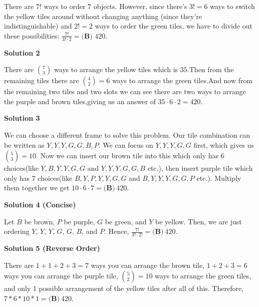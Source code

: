 \begin{enumerate}
 There are $7!$ ways to order $7$ objects. However, since there's $3!=6$ ways to switch the yellow tiles around without changing anything (since they're indistinguishable) and $2!=2$ ways to order the green tiles, we have to divide out these possibilities: $\frac{7!}{3! \cdot2}=\boxed{\textbf{(B) }420}$. 

 



\textbf{Solution 2}

There are $\binom{7}{3}$ ways to arrange the yellow tiles which is $35$.Then from the remaining tiles there are $\binom{4}{2}=6$ ways to arrange the green tiles.And now from the remaining two tiles and two slots we can see there are two ways to arrange the purple and brown tiles,giving us an answer of $35\cdot6\cdot2=420$.

 



\textbf{Solution 3}

We can choose a different frame to solve this problem. Our tile combination can be written as $Y, Y, Y, G, G, B, P.$ We can focus on $Y, Y, Y, G, G$ first, which gives us $\binom{5}{3}=10.$ Now we can insert our brown tile into this which only has $6$ choices(like $Y,B, Y, Y, G, G$ and $Y, Y, Y, G, G, B$ etc.), then insert purple tile which only has $7$ choices(like $B,Y, P, Y, Y, G, G$ and $B, Y, Y, Y, G, G, P$ etc.). Multiply them together we get $10\cdot 6\cdot 7=\boxed{\textbf{(B)}\ 420}$.

 



\textbf{Solution 4 (Concise)}

Let $B$ be brown, $P$ be purple, $G$ be green, and $Y$ be yellow. Then, we are just ordering $Y$, $Y$, $Y$, $G$, $G$, $B$, and $P$. Hence, $\frac{7!}{3! \cdot 2!} = \boxed{\textbf{(B)}\ 420}$.

 



\textbf{Solution 5 (Reverse Order)}

There are $1 + 1 + 2 + 3 = 7$ ways you can arrange the brown tile, $1 + 2 + 3 = 6$ ways you can arrange the purple tile, $\binom{5}{2} = 10$ ways to arrange the green tiles, and only 1 possible arrangement of the yellow tiles after all of this. Therefore, $7 * 6 * 10 * 1 = \boxed{\textbf{(B)}\ 420}$.

 


 


 



\end{enumerate}
